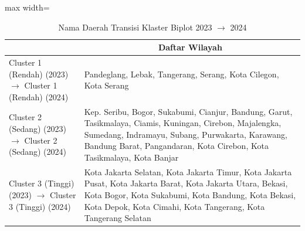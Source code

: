 \begin{table}[H]
\centering
\caption{Nama Daerah Transisi Klaster Biplot 2023 \(\rightarrow\) 2024} \label{tab:app1biplot_trans_name_2023x2024}
\begin{adjustbox}{max width=\textwidth}
\begin{tabular}{|>{\centering\arraybackslash}p{4cm}|p{10cm}|}
\hline
\multicolumn{1}{|c|}{\textbf{Kategori}} & \multicolumn{1}{c|}{\textbf{Daftar Wilayah}} \\
\hline
Cluster 1 (Rendah) (2023) \(\rightarrow\) Cluster 1 (Rendah) (2024) & Pandeglang, Lebak, Tangerang, Serang, Kota Cilegon, Kota Serang \\
\hline
Cluster 2 (Sedang) (2023) \(\rightarrow\) Cluster 2 (Sedang) (2024) & Kep. Seribu, Bogor, Sukabumi, Cianjur, Bandung, Garut, Tasikmalaya, Ciamis, Kuningan, Cirebon, Majalengka, Sumedang, Indramayu, Subang, Purwakarta, Karawang, Bandung Barat, Pangandaran, Kota Cirebon, Kota Tasikmalaya, Kota Banjar \\
\hline
Cluster 3 (Tinggi) (2023) \(\rightarrow\) Cluster 3 (Tinggi) (2024) & Kota Jakarta Selatan, Kota Jakarta Timur, Kota Jakarta Pusat, Kota Jakarta Barat, Kota Jakarta Utara, Bekasi, Kota Bogor, Kota Sukabumi, Kota Bandung, Kota Bekasi, Kota Depok, Kota Cimahi, Kota Tangerang, Kota Tangerang Selatan \\
\hline
\end{tabular}
\end{adjustbox}
\end{table}